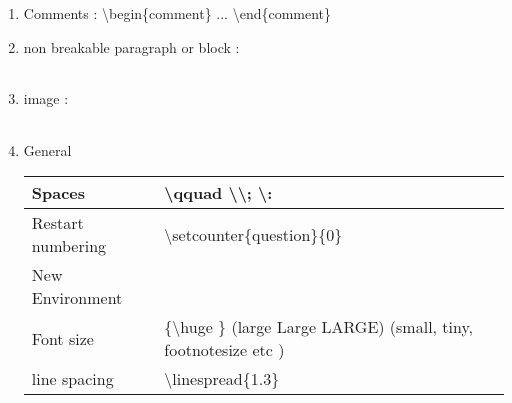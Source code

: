 \begin{enumerate}
     \item Comments  :  \textbackslash begin\{comment\}      ...   \textbackslash end\{comment\}

     \item non breakable paragraph or block :

          \begin{myTableStyle} \begin{tabular}{ |m{8cm}| } \hline
               \\ \hline
          \end{tabular} \end{myTableStyle} \vspace{0.08in}
          \vspace{0.08in}

     \item image :

          \begin{myTableStyle} \begin{tabular}{ |m{14cm}| } \hline
               \\ \hline
          \end{tabular} \end{myTableStyle} \vspace{0.08in}
          \vspace{0.08in}


     \item   General

          \begin{myTableStyle} \begin{tabular}{ |m{4cm}|m{10cm}| } \hline
               Spaces  & \textbackslash qquad  \qquad \textbackslash \qquad \textbackslash ; \qquad \textbackslash : \\ \hline

               Restart numbering &  \textbackslash setcounter\{question\}\{0\} \\ \hline

               New Environment &   \\ \hline

               Font size &  \{\textbackslash huge \}   (large Large LARGE) (small, tiny, footnotesize etc ) \\ \hline

               line spacing & \textbackslash linespread\{1.3\} \\ \hline
          \end{tabular} \end{myTableStyle} \vspace{0.08in}
          \vspace{0.08in}

\end{enumerate}
